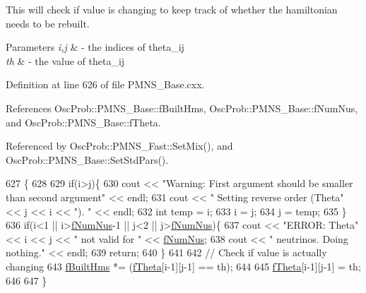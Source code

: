 This will check if value is changing to keep track of whether the hamiltonian needs to be rebuilt.


\begin{DoxyParams}{Parameters}
{\em i,j} & -\/ the indices of theta\+\_\+ij \\
\hline
{\em th} & -\/ the value of theta\+\_\+ij \\
\hline
\end{DoxyParams}


Definition at line 626 of file P\+M\+N\+S\+\_\+\+Base.\+cxx.



References Osc\+Prob\+::\+P\+M\+N\+S\+\_\+\+Base\+::f\+Built\+Hms, Osc\+Prob\+::\+P\+M\+N\+S\+\_\+\+Base\+::f\+Num\+Nus, and Osc\+Prob\+::\+P\+M\+N\+S\+\_\+\+Base\+::f\+Theta.



Referenced by Osc\+Prob\+::\+P\+M\+N\+S\+\_\+\+Fast\+::\+Set\+Mix(), and Osc\+Prob\+::\+P\+M\+N\+S\+\_\+\+Base\+::\+Set\+Std\+Pars().


\begin{DoxyCode}
627 \{
628 
629   \textcolor{keywordflow}{if}(i>j)\{
630     cout << \textcolor{stringliteral}{"Warning: First argument should be smaller than second argument"} << endl;
631     cout << \textcolor{stringliteral}{"         Setting reverse order (Theta"} << j << i << \textcolor{stringliteral}{"). "} << endl;
632     \textcolor{keywordtype}{int} temp = i;
633     i = j;
634     j = temp;
635   \}
636   \textcolor{keywordflow}{if}(i<1 || i>\hyperlink{classOscProb_1_1PMNS__Base_a24bb74bed63569dfe88b18fa6a08060e}{fNumNus}-1 || j<2 || j>\hyperlink{classOscProb_1_1PMNS__Base_a24bb74bed63569dfe88b18fa6a08060e}{fNumNus})\{
637     cout << \textcolor{stringliteral}{"ERROR: Theta"} << i << j << \textcolor{stringliteral}{" not valid for "} << \hyperlink{classOscProb_1_1PMNS__Base_a24bb74bed63569dfe88b18fa6a08060e}{fNumNus};
638     cout << \textcolor{stringliteral}{" neutrinos. Doing nothing."} << endl;
639     \textcolor{keywordflow}{return};
640   \}
641 
642   \textcolor{comment}{// Check if value is actually changing}
643   \hyperlink{classOscProb_1_1PMNS__Base_a9ac3cadeac8db1b90f3152f476244780}{fBuiltHms} *= (\hyperlink{classOscProb_1_1PMNS__Base_a1976887cd658dd86b2336c181f1470b4}{fTheta}[i-1][j-1] == th);
644 
645   \hyperlink{classOscProb_1_1PMNS__Base_a1976887cd658dd86b2336c181f1470b4}{fTheta}[i-1][j-1] = th;
646 
647 \}
\end{DoxyCode}
\mbox{\label{classOscProb_1_1PMNS__Base_aba565962a440d14bee7a2a96d2eca2c5}} 
